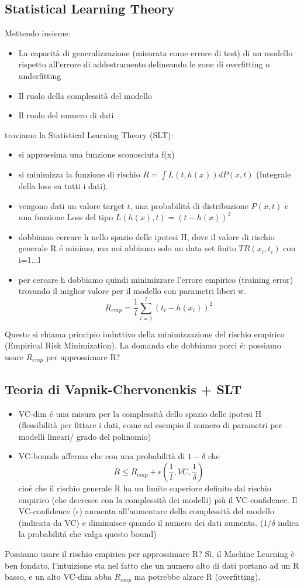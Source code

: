 \documentclass{article}
\begin{document}
\subsection{Statistical Learning Theory}
Mettendo insieme: 
\begin{itemize}
    \item La capacità di generalizzazione (misurata come errore di test) di un modello rispetto all'errore di addestramento delineando le zone di overfitting o underfitting
    \item Il ruolo della complessità del modello
    \item Il ruolo del numero di dati
\end{itemize}
troviamo la Statistical Learning Theory (SLT):
\begin{itemize}
    \item si approssima una funzione sconosciuta f(x)
    \item si minimizza la funzione di rischio $R=\int L(t,h(x))dP(x,t)$ (Integrale della loss su tutti i dati).
    \item vengono dati un valore target $t$, una probabilitá di distribuzione $P(x,t)$ e una funzione Loss del tipo $L(h(x),t)=(t-h(x))^2$
    \item dobbiamo cercare h nello spazio delle ipotesi H, dove il valore di rischio generale R é minimo, ma noi abbiamo solo un data set finito $TR(x_i,t_i)$ con i=1...l
    \item per cercare h dobbiamo quindi minimizzare l'errore empirico (training error) trovando il miglior valore per il modello con parametri liberi w. \[R_{emp}=\frac{1}{l}\sum_{i = 1}^l (t_i-h(x_i))^2\]
\end{itemize}
Questo si chiama principio induttivo della minimizzazione del rischio empirico (Empirical Risk Minimization). La domanda che dobbiamo porci é: possiamo usare $R_{emp}$ per approssimare R?

\subsection{Teoria di Vapnik-Chervonenkis + SLT}
\begin{itemize}
    \item VC-dim é una misura per la complessità dello spazio delle ipotesi H (flessibilità per fittare i dati, come ad esempio il numero di parametri per modelli lineari/ grado del polinomio)
    \item VC-bounds afferma che con una probabilità di $1-\delta$ che \[ R \leq R_{emp} + \epsilon(\frac{1}{l},VC,\frac{1}{\delta})\]
    cioè che il rischio generale R ha un limite superiore definito dal rischio empirico (che decresce con la complessità dei modelli) più il VC-confidence. Il VC-confidence ($\epsilon$) aumenta all'aumentare della complessità del modello (indicata da VC) e diminuisce quando il numero dei dati aumenta. ($1/\delta$ indica la probabilitá che valga questo bound)
\end{itemize}
Possiamo usare il rischio empirico per approssimare R? Sì, il Machine Learning è ben fondato, l'intuizione sta nel fatto che un numero alto di dati portano ad un R basso, e un alto VC-dim abba $R_{emp}$ ma potrebbe alzare R (overfitting).
\end{document}
